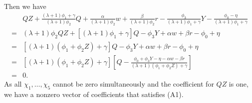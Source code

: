 \documentclass[11pt, a4paper]{article}
\begin{document}
Then we have
\begin{align*}
    &QZ + \frac{(\lambda + 1)\phi_1 + \gamma}{(\lambda + 1)\phi_2}Q +  \frac{\alpha}{(\lambda + 1)\phi_2} w +  \frac{\beta}{(\lambda + 1)\phi_2}r -\frac{\phi_3}{(\lambda + 1)\phi_1 + \gamma}Y -\frac{\phi_0 - \eta}{(\lambda + 1)\phi_1 + \gamma} \\
    =& (\lambda + 1)\phi_2QZ + [(\lambda + 1)\phi_1 + \gamma]Q  -\phi_3 Y + \alpha w + \beta r - \phi_0 + \eta\\
    =& [(\lambda + 1)(\phi_1 + \phi_2 Z) + \gamma]Q  -\phi_3 Y + \alpha w + \beta r - \phi_0 + \eta\\
    =& [(\lambda + 1)(\phi_1 + \phi_2 Z) + \gamma]\left[ Q - \frac{\phi_0 + \phi_3 Y - \eta- \alpha w - \beta r}{(\lambda + 1)(\phi_1 + \phi_2 Z) + \gamma}\right]\\
    =& 0.
\end{align*}
As all $\chi_1, \ldots, \chi_5$ cannot be zero simultaneously and the coefficient for $QZ$ is one, we have a nonzero vector of coefficients that satisfies (A1).
\end{document}
